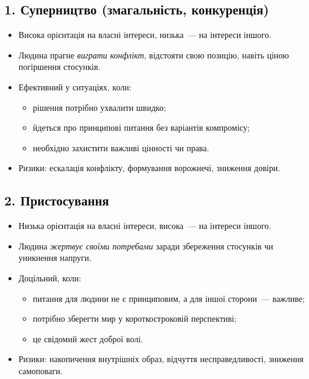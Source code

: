 \documentclass[12pt,a4paper]{article}
\begin{document}
    \subsection*{1. Суперництво (змагальність, конкуренція)}
    \begin{itemize}
        \item Висока орієнтація на власні інтереси, низька~--- на інтереси іншого.
        \item Людина прагне \textit{виграти конфлікт}, відстояти свою позицію, навіть ціною погіршення стосунків.
        \item Ефективний у ситуаціях, коли:
        \begin{itemize}
            \item рішення потрібно ухвалити швидко;
            \item йдеться про принципові питання без варіантів компромісу;
            \item необхідно захистити важливі цінності чи права.
        \end{itemize}
        \item Ризики: ескалація конфлікту, формування ворожнечі, зниження довіри.
    \end{itemize}

    \subsection*{2. Пристосування}
    \begin{itemize}
        \item Низька орієнтація на власні інтереси, висока~--- на інтереси іншого.
        \item Людина \textit{жертвує своїми потребами} заради збереження стосунків чи уникнення напруги.
        \item Доцільний, коли:
        \begin{itemize}
            \item питання для людини не є принциповим, а для іншої сторони~--- важливе;
            \item потрібно зберегти мир у короткостроковій перспективі;
            \item це свідомий жест доброї волі.
        \end{itemize}
        \item Ризики: накопичення внутрішніх образ, відчуття несправедливості, зниження самоповаги.
    \end{itemize}
\end{document}

